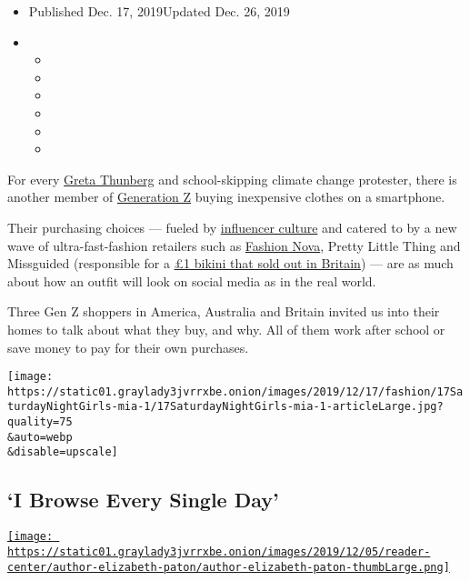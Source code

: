 \begin{itemize}
\item
  Published Dec. 17, 2019Updated Dec. 26, 2019
\item
  \begin{itemize}
  \item
  \item
  \item
  \item
  \item
  \item
  \end{itemize}
\end{itemize}

For every
\href{https://www.nytimes3xbfgragh.onion/2019/09/18/climate/greta-thunberg.html}{Greta
Thunberg} and school-skipping climate change protester, there is another
member of
\href{https://www.nytimes3xbfgragh.onion/2019/03/28/us/gen-z-in-their-words.html}{Generation
Z} buying inexpensive clothes on a smartphone.

Their purchasing choices --- fueled by
\href{https://www.nytimes3xbfgragh.onion/2019/07/16/technology/vidcon-social-media-influencers.html}{influencer
culture} and catered to by a new wave of ultra-fast-fashion retailers
such as
\href{https://www.nytimes3xbfgragh.onion/2019/12/16/business/fashion-nova-underpaid-workers.html}{Fashion
Nova}, Pretty Little Thing and Missguided (responsible for a
\href{https://www.theguardian.com/fashion/2019/jun/22/one-pound-bikini-missguided-fast-fashion-leaves-high-street-behind}{£1
bikini that sold out in Britain}) --- are as much about how an outfit
will look on social media as in the real world.

Three Gen Z shoppers in America, Australia and Britain invited us into
their homes to talk about what they buy, and why. All of them work after
school or save money to pay for their own purchases.

\texttt{[image: https://static01.graylady3jvrrxbe.onion/images/2019/12/17/fashion/17SaturdayNightGirls-mia-1/17SaturdayNightGirls-mia-1-articleLarge.jpg?quality=75\\\&auto=webp\\\&disable=upscale]}

\hypertarget{i-browse-every-single-day}{%
\subsection{`I Browse Every Single
Day'}\label{i-browse-every-single-day}}

\href{https://www.nytimes3xbfgragh.onion/by/elizabeth-paton}{\texttt{[image: https://static01.graylady3jvrrxbe.onion/images/2019/12/05/reader-center/author-elizabeth-paton/author-elizabeth-paton-thumbLarge.png]}}

